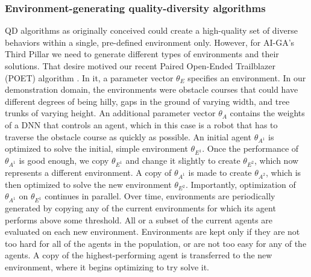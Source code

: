 \documentclass{article}
\begin{document}
\subsubsection{Environment-generating quality-diversity algorithms}

QD algorithms as originally conceived could create a high-quality set of diverse behaviors within a single, pre-defined environment only. However, for AI-GA's Third Pillar we need to generate different types of environments and their solutions. That desire motived our recent Paired Open-Ended Trailblazer (POET) algorithm \cite{wang2019paired}. In it, a parameter vector $\theta_{E}$ specifies an environment. In our demonstration domain, the environments were obstacle courses that could have different degrees of being hilly, gaps in the ground of varying width, and tree trunks of varying height. An additional parameter vector $\theta_{A}$ contains the weights of a DNN that controls an agent, which in this case is a robot that has to traverse the obstacle course as quickly as possible. An initial agent $\theta_{A^1}$ is optimized to solve the initial, simple environment $\theta_{E^1}$. Once the performance of $\theta_{A^1}$ is good enough, we copy $\theta_{E^1}$ and change it slightly to create $\theta_{E^2}$, which now represents a different environment.
A copy of $\theta_{A^1}$ is made to create $\theta_{A^2}$, which is then optimized to solve the new environment $\theta_{E^2}$. Importantly, optimization of $\theta_{A^1}$ on $\theta_{E^1}$ continues in parallel. Over time, environments are periodically generated by copying any of the current environments for which its agent performs above some threshold. All or a subset of the current agents are evaluated on each new environment. Environments are kept only if they are not too hard for all of the agents in the population, or are not too easy for any of the agents. A copy of the highest-performing agent is transferred to the new environment, where it begins optimizing to try solve it. 
\end{document}
